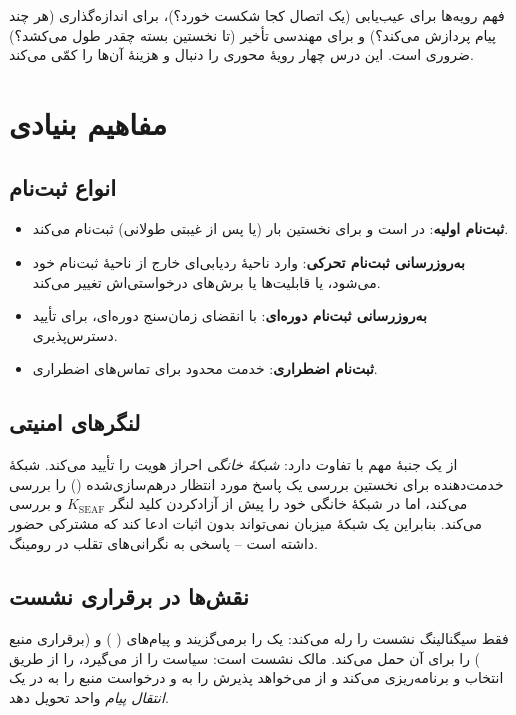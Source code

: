 \documentclass[11pt,a4paper]{article}
\begin{document}
فهم رویه‌ها برای عیب‌یابی (یک اتصال کجا شکست خورد؟)، برای اندازه‌گذاری (هر  چند پیام پردازش می‌کند؟) و برای مهندسی
تأخیر (تا نخستین بسته چقدر طول می‌کشد؟) ضروری است. این درس چهار رویهٔ محوری را دنبال و هزینهٔ آن‌ها را کمّی می‌کند.

\section{مفاهیم بنیادی}

\subsection{انواع ثبت‌نام}
\begin{itemize}
  \item \textbf{ثبت‌نام اولیه}:  در  است و برای نخستین بار (یا پس از غیبتی طولانی) ثبت‌نام می‌کند.
  \item \textbf{به‌روزرسانی ثبت‌نام تحرکی}:  وارد ناحیهٔ ردیابی‌ای خارج از ناحیهٔ ثبت‌نام خود می‌شود، یا قابلیت‌ها یا
        برش‌های درخواستی‌اش تغییر می‌کند.
  \item \textbf{به‌روزرسانی ثبت‌نام دوره‌ای}: با انقضای زمان‌سنج دوره‌ای، برای تأیید دسترس‌پذیری.
  \item \textbf{ثبت‌نام اضطراری}: خدمت محدود برای تماس‌های اضطراری.
\end{itemize}

\subsection{لنگرهای امنیتی}
 \cite{ts33501} از یک جنبهٔ مهم با  تفاوت دارد: \emph{شبکهٔ خانگی} احراز هویت را تأیید می‌کند. 
شبکهٔ خدمت‌دهنده برای نخستین بررسی یک پاسخ مورد انتظار درهم‌سازی‌شده () را بررسی می‌کند، اما  در شبکهٔ
خانگی خود  را پیش از آزادکردن کلید لنگر $K_{\mathrm{SEAF}}$ و  بررسی می‌کند. بنابراین یک شبکهٔ میزبان نمی‌تواند
بدون اثبات ادعا کند که مشترکی حضور داشته است -- پاسخی به نگرانی‌های تقلب در رومینگ.

\subsection{نقش‌ها در برقراری نشست}
 فقط سیگنالینگ نشست را رله می‌کند: یک  را برمی‌گزیند و پیام‌های  ( ) و 
(برقراری منبع ) را برای آن حمل می‌کند.  مالک نشست است: سیاست را از  می‌گیرد،  را از طریق
 انتخاب و برنامه‌ریزی می‌کند و از  می‌خواهد پذیرش  را به  و درخواست منبع را به  در یک
\emph{انتقال پیام } واحد تحویل دهد.
\end{document}
